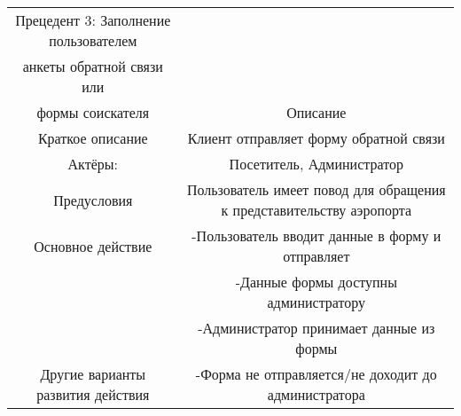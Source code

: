 \begin{table}[h]
    \begin{tabular}{|c|c|}
    \hline
    Прецедент 3: Заполнение пользователем\\ анкеты обратной связи или\\ формы соискателя         & Описание                                                                                              \\ \hline
    Краткое описание                  & Клиент отправляет форму обратной связи                                                            \\ \hline
    Актёры:                           & Посетитель, Администратор                                                                                            \\ \hline
    Предусловия                       & Пользователь имеет повод для обращения к представительству аэропорта                                   \\ \hline
    Основное действие                 & -Пользователь вводит данные в форму и отправляет\\ &-Данные формы доступны администратору\\ &-Администратор принимает данные из формы \\ \hline
    Другие варианты развития действия & -Форма не отправляется/не доходит до администратора                                      \\ \hline
    \end{tabular}
\end{table}


